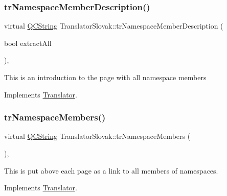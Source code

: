 \mbox{\label{class_translator_slovak_a499c21ad04401fcd3844e1eaa2eebf41}} 
\subsubsection{\texorpdfstring{trNamespaceMemberDescription()}{trNamespaceMemberDescription()}}
{\footnotesize\ttfamily virtual \mbox{\hyperlink{class_q_c_string}{Q\+C\+String}} Translator\+Slovak\+::tr\+Namespace\+Member\+Description (\begin{DoxyParamCaption}\item[{bool}]{extract\+All }\end{DoxyParamCaption})\hspace{0.3cm}{\ttfamily [inline]}, {\ttfamily [virtual]}}

This is an introduction to the page with all namespace members 

Implements \mbox{\hyperlink{class_translator}{Translator}}.

\mbox{\label{class_translator_slovak_a79e4a74c97bee3cede40dadce9b41cc6}} 
\subsubsection{\texorpdfstring{trNamespaceMembers()}{trNamespaceMembers()}}
{\footnotesize\ttfamily virtual \mbox{\hyperlink{class_q_c_string}{Q\+C\+String}} Translator\+Slovak\+::tr\+Namespace\+Members (\begin{DoxyParamCaption}{ }\end{DoxyParamCaption})\hspace{0.3cm}{\ttfamily [inline]}, {\ttfamily [virtual]}}

This is put above each page as a link to all members of namespaces. 

Implements \mbox{\hyperlink{class_translator}{Translator}}.

\mbox{\label{class_translator_slovak_a7ad96e94eaff0ecb172efeeab9dc4bfc}} 
